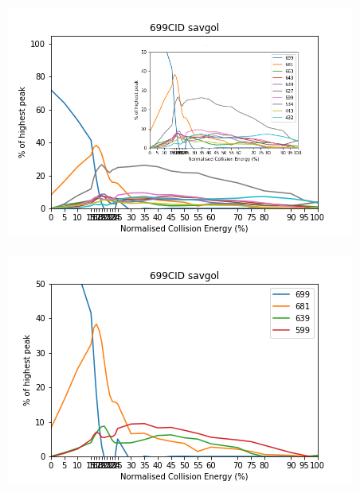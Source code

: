 \begin{figure}[!htbp]
  \begin{subfigure}[b]{0.5\textwidth}
    \includegraphics[width=\textwidth, height=\textwidth]{figures/Kapitel4/Kataboliten/diags/699CID-savgol2.png}
    \caption{}
    \label{fig:699MKLeafspraydiags1}
  \end{subfigure}
  \hfill
  \begin{subfigure}[b]{0.5\textwidth}
    \includegraphics[width=\textwidth, height=\textwidth]{figures/Kapitel4/Kataboliten/diags/699CID-savgol1.png}
    \caption{}
    \label{fig:699MKstructurediags2}
  \end{subfigure}
  

\end{figure}
